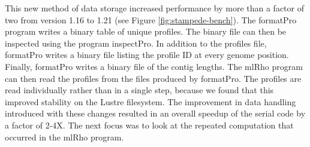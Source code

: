 \documentclass{sig-alternate}
\begin{document}
This new method of data storage increased performance by more than a factor of two from version
1.16 to 1.21 (see Figure \ref{fig:stampede-bench}). The formatPro program writes a binary table of unique
profiles.
The binary file can then be inspected using the program inspectPro.
In addition to the profiles file, formatPro writes a binary file
listing the profile ID at every genome position.
Finally, formatPro writes a binary file of the contig lengths.
The mlRho program can then read the profiles from the files produced by formatPro.
The profiles are read individually rather than in a single
step, because we found that this improved stability on the Lustre filesystem.
 The improvement in data handling introduced with these changes resulted in an overall speedup of the
serial code by a factor of 2-4X. The next focus was to look at the repeated computation that occurred in the
mlRho program. 
\end{document}
